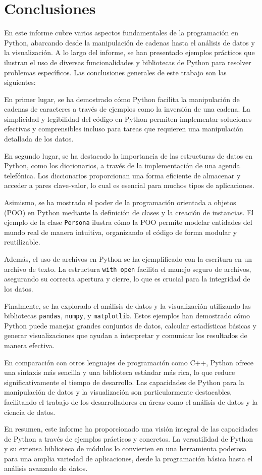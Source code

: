 \documentclass[conference]{IEEEtran}
\begin{document}
	


\section{Conclusiones}

En este informe cubre varios aspectos fundamentales de la programación en Python, abarcando desde la manipulación de cadenas hasta el análisis de datos y la visualización. A lo largo del informe, se han presentado ejemplos prácticos que ilustran el uso de diversas funcionalidades y bibliotecas de Python para resolver problemas específicos. Las conclusiones generales de este trabajo son las siguientes:

En primer lugar, se ha demostrado cómo Python facilita la manipulación de cadenas de caracteres a través de ejemplos como la inversión de una cadena. La simplicidad y legibilidad del código en Python permiten implementar soluciones efectivas y comprensibles incluso para tareas que requieren una manipulación detallada de los datos.

En segundo lugar, se ha destacado la importancia de las estructuras de datos en Python, como los diccionarios, a través de la implementación de una agenda telefónica. Los diccionarios proporcionan una forma eficiente de almacenar y acceder a pares clave-valor, lo cual es esencial para muchos tipos de aplicaciones.

Asimismo, se ha mostrado el poder de la programación orientada a objetos (POO) en Python mediante la definición de clases y la creación de instancias. El ejemplo de la clase \texttt{Persona} ilustra cómo la POO permite modelar entidades del mundo real de manera intuitiva, organizando el código de forma modular y reutilizable.

Además, el uso de archivos en Python se ha ejemplificado con la escritura en un archivo de texto. La estructura \texttt{with open} facilita el manejo seguro de archivos, asegurando su correcta apertura y cierre, lo que es crucial para la integridad de los datos.

Finalmente, se ha explorado el análisis de datos y la visualización utilizando las bibliotecas \texttt{pandas}, \texttt{numpy}, y \texttt{matplotlib}. Estos ejemplos han demostrado cómo Python puede manejar grandes conjuntos de datos, calcular estadísticas básicas y generar visualizaciones que ayudan a interpretar y comunicar los resultados de manera efectiva.

En comparación con otros lenguajes de programación como C++, Python ofrece una sintaxis más sencilla y una biblioteca estándar más rica, lo que reduce significativamente el tiempo de desarrollo. Las capacidades de Python para la manipulación de datos y la visualización son particularmente destacables, facilitando el trabajo de los desarrolladores en áreas como el análisis de datos y la ciencia de datos.

En resumen, este informe ha proporcionado una visión integral de las capacidades de Python a través de ejemplos prácticos y concretos. La versatilidad de Python y su extensa biblioteca de módulos lo convierten en una herramienta poderosa para una amplia variedad de aplicaciones, desde la programación básica hasta el análisis avanzado de datos.
\end{document}
